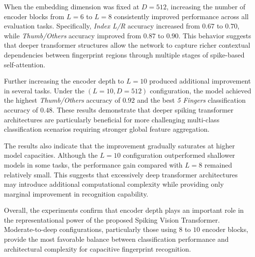 \documentclass[../main.tex]{subfiles}
\begin{document}
When the embedding dimension was fixed at \(D=512\), increasing the number of encoder blocks from \(L=6\) to \(L=8\) consistently improved performance across all evaluation tasks. Specifically, \textit{Index L/R} accuracy increased from \(0.67\) to \(0.70\), while \textit{Thumb/Others} accuracy improved from \(0.87\) to \(0.90\). This behavior suggests that deeper transformer structures allow the network to capture richer contextual dependencies between fingerprint regions through multiple stages of spike-based self-attention.

Further increasing the encoder depth to \(L=10\) produced additional improvement in several tasks. Under the \((L=10, D=512)\) configuration, the model achieved the highest \textit{Thumb/Others} accuracy of \(0.92\) and the best \textit{5 Fingers} classification accuracy of \(0.48\). These results demonstrate that deeper spiking transformer architectures are particularly beneficial for more challenging multi-class classification scenarios requiring stronger global feature aggregation.

The results also indicate that the improvement gradually saturates at higher model capacities. Although the \(L=10\) configuration outperformed shallower models in some tasks, the performance gain compared with \(L=8\) remained relatively small. This suggests that excessively deep transformer architectures may introduce additional computational complexity while providing only marginal improvement in recognition capability.

Overall, the experiments confirm that encoder depth plays an important role in the representational power of the proposed Spiking Vision Transformer. Moderate-to-deep configurations, particularly those using \(8\) to \(10\) encoder blocks, provide the most favorable balance between classification performance and architectural complexity for capacitive fingerprint recognition.
\end{document}

